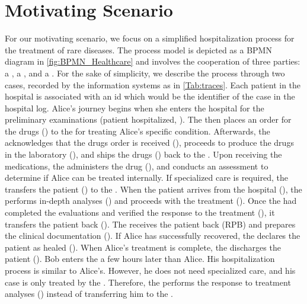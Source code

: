 \section{Motivating Scenario}\label{sec:motivating}
For our motivating scenario, we focus on a simplified hospitalization process for the treatment of rare diseases.
The process model is depicted as a BPMN diagram in \cref{fig:BPMN_Healthcare} and involves the cooperation of three parties: a , a , and a .
For the sake of simplicity, we describe the process through two cases, recorded by the information systems as in \cref{Tab:traces}. 
Each patient in the hospital is associated with an id which would be the identifier of the case in the hospital log.
Alice's journey %
begins when she enters the hospital for the preliminary examinations (patient hospitalized, ). The  then places an order for the drugs () to the  for  treating Alice's specific condition. Afterwards, the  acknowledges that the drugs order is received (), proceeds to produce the drugs in the laboratory (), and ships the drugs () back to the . Upon receiving the medications, the  administers the drug (), and conducts an assessment to determine if Alice can be treated internally. If specialized care is required, the  transfers the patient () to the . When the patient arrives from the hospital (), the  performs in-depth analyses () and proceeds with the treatment (). Once the  had completed the evaluations and verified the response to the treatment (), it transfers the patient back (). The  receives the patient back \Activ(RPB) and prepares the clinical documentation (). If Alice has successfully recovered, the  declares the patient as healed (). When Alice's treatment is complete, the  discharges the patient (). 
%
Bob %
enters the  a few hours later than Alice. His hospitalization process is similar to Alice's. However, he does not need specialized care, and his case is only treated by the . Therefore, the  performs the response to treatment analyses () instead of transferring him to the . 

